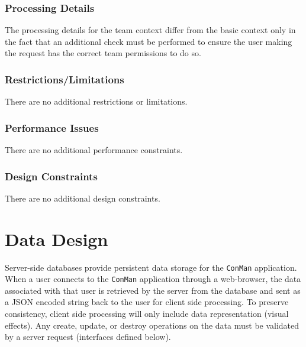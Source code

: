 \documentclass{article}
\begin{document}
\subsubsection{Processing Details}
The processing details for the team context differ from the basic context only in the fact that an additional check must be performed to ensure the user making the request has the correct team permissions to do so.
\subsubsection{Restrictions/Limitations}
There are no additional restrictions or limitations.
\subsubsection{Performance Issues}
There are no additional performance constraints.
\subsubsection{Design Constraints}
There are no additional design constraints.

%
%
%
%


\newpage
\section{Data Design}
Server-side databases provide persistent data storage for the \texttt{ConMan} application.
When a user connects to the \texttt{ConMan} application through a web-browser, the data associated with that user is retrieved by the server from the database and sent as a JSON encoded string back to the user for client side processing.
To preserve consistency, client side processing will only include data representation (visual effects).
Any create, update, or destroy operations on the data must be validated by a server request (interfaces defined below).
\end{document}
